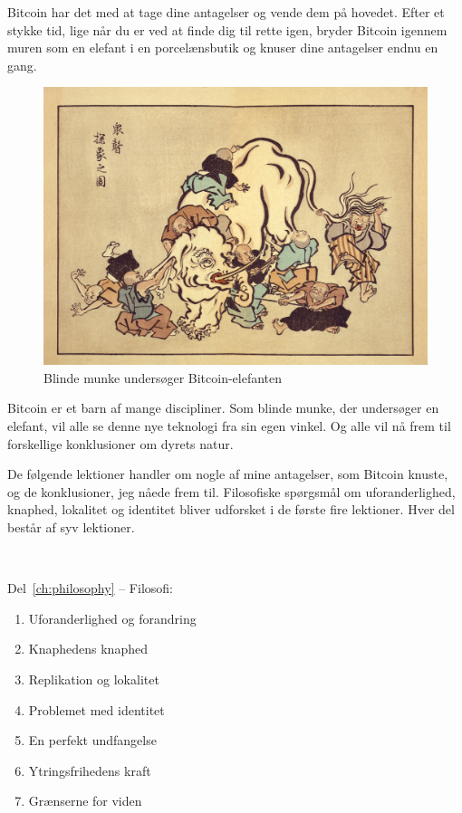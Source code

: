 \documentclass[paper=6in:9in,pagesize=pdftex,
               headinclude=on,footinclude=on,12pt]{scrbook}
\begin{document}
Bitcoin har det med at tage dine antagelser og vende dem på hovedet. Efter et stykke tid, lige når du er ved at finde dig til rette igen, bryder Bitcoin igennem muren som en elefant i en porcelænsbutik og knuser dine antagelser endnu en gang.\begin{figure}
  \includegraphics{assets/images/blind-monks.jpg}
  \caption{Blinde munke undersøger Bitcoin-elefanten}
  \label{fig:blind-monks}
\end{figure}

Bitcoin er et barn af mange discipliner. Som blinde munke, der undersøger en elefant, vil alle se denne nye teknologi fra sin egen vinkel. Og alle vil nå frem til forskellige konklusioner om dyrets natur.

De følgende lektioner handler om nogle af mine antagelser, som Bitcoin knuste, og de konklusioner, jeg nåede frem til. Filosofiske spørgsmål om uforanderlighed, knaphed, lokalitet og identitet bliver udforsket i de første fire lektioner. Hver del består af syv lektioner.

~\begin{samepage} Del~\ref{ch:philosophy} -- Filosofi:\begin{enumerate}
  \item Uforanderlighed og forandring \item Knaphedens knaphed \item Replikation og lokalitet \item Problemet med identitet \item En perfekt undfangelse \item Ytringsfrihedens kraft \item Grænserne for viden \end{enumerate}
\end{samepage}
\end{document}
